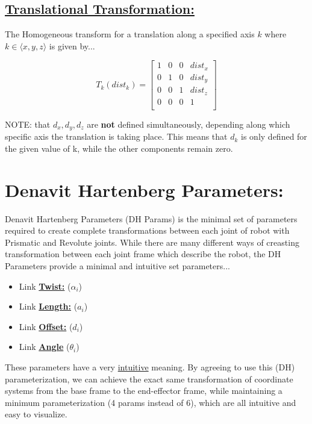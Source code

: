 \documentclass[12px]{article}
\begin{document}
\subsection*{\underline{Translational Transformation:}}

The Homogeneous transform for a translation along a specified axis $k$ where $k \in \langle x, y, z\rangle$  is given by...

$$
T_{k}(dist_k) =
\begin{bmatrix}
    1 & 0 & 0 &  dist_x \\
    0 & 1 & 0 &  dist_y \\
    0 & 0 & 1 &  dist_z \\
    0 & 0 & 0 &  1 \\
\end{bmatrix}
$$

NOTE: that $d_x, d_y, d_z$ are \textbf{not} defined simultaneously, depending along which specific axis the translation is taking place. This means that $d_k$ is only defined for the given value of k, while the other components remain zero.


\section*{Denavit Hartenberg Parameters:}

Denavit Hartenberg Parameters (DH Params) is the minimal set of parameters required to create complete transformations between each joint of robot with Prismatic and Revolute joints. While there are many different ways of creasting transformation between each joint frame which describe the robot, the DH Parameters provide a minimal and intuitive set parameters...

\begin{itemize}
    \item Link \underline{\textbf{Twist:}} ($\alpha_i$)
    \item Link \underline{\textbf{Length:}} ($a_i$)
    \item Link \underline{\textbf{Offset:}} ($d_i$)
    \item Link \underline{\textbf{Angle}} ($\theta_i$)
\end{itemize}

\noindent These parameters have a very \underline{intuitive} meaning. By agreeing to use this (DH) parameterization, we can achieve the exact same transformation of coordinate systems from the base frame to the end-effector frame, while maintaining a minimum parameterization (4 params instead of 6), which are all intuitive and easy to visualize.
\end{document}
